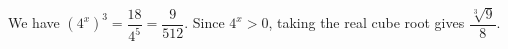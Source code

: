 We have $(4^x)^3=\dfrac{18}{4^5}=\dfrac{9}{512}$. Since $ 4^x>0 $, taking the real cube root gives $\boxed{\dfrac{\sqrt[3]9}{8}}$.

